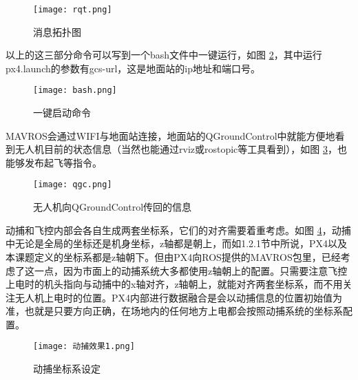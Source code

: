 \begin{figure}[!h]
  \centering
  \texttt{[image: rqt.png]}
  \caption{消息拓扑图}
  \label{rqt}
\end{figure}

以上的这三部分命令可以写到一个bash文件中一键运行，如图 \ref{一键}，其中运行px4.launch的参数有gcs-url，这是地面站的ip地址和端口号。
\begin{figure}[!h]
  \centering
  \texttt{[image: bash.png]}
  \caption{一键启动命令}
  \label{一键}
\end{figure}
MAVROS会通过WIFI与地面站连接，地面站的QGroundControl中就能方便地看到无人机目前的状态信息（当然也能通过rviz或rostopic等工具看到），如图 \ref{qgc}，也能够发布起飞等指令。
\begin{figure}[!h]
  \centering
  \texttt{[image: qgc.png]}
  \caption{无人机向QGroundControl传回的信息}
  \label{qgc}
\end{figure}
\newpage
动捕和飞控内部会各自生成两套坐标系，它们的对齐需要着重考虑。如图 \ref{动捕效果}，动捕中无论是全局的坐标还是机身坐标，z轴都是朝上，而如1.2.1节中所说，PX4以及本课题定义的坐标系都是z轴朝下。但由PX4向ROS提供的MAVROS包里，已经考虑了这一点，因为市面上的动捕系统大多都使用z轴朝上的配置。只需要注意飞控上电时的机头指向与动捕中的x轴对齐，z轴朝上，就能对齐两套坐标系\cite{px4}，而不用关注无人机上电时的位置。PX4内部进行数据融合是会以动捕信息的位置初始值为准，也就是只要方向正确，在场地内的任何地方上电都会按照动捕系统的坐标系配置。
\begin{figure}[!h]
  \centering
  \texttt{[image: 动捕效果1.png]}
  \caption{动捕坐标系设定}
  \label{动捕效果}
\end{figure}


